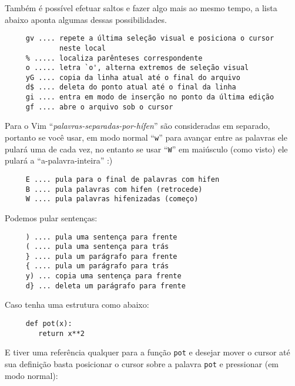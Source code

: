 Também é possível efetuar saltos e fazer algo mais ao mesmo tempo, a lista abaixo aponta 
algumas dessas possibilidades. %
\begin{verbatim}     
     gv .... repete a última seleção visual e posiciona o cursor
             neste local
     % ..... localiza parênteses correspondente
     o ..... letra `o', alterna extremos de seleção visual
     yG .... copia da linha atual até o final do arquivo
     d$ .... deleta do ponto atual até o final da linha
     gi .... entra em modo de inserção no ponto da última edição
     gf .... abre o arquivo sob o cursor
\end{verbatim}

Para o Vim ``{\em{palavras-separadas-por-hífen}}'' são consideradas em separado, portanto se você usar,
em modo normal ``\verb+w+'' para avançar entre as palavras ele pulará uma de
cada vez, no entanto se usar ``\verb+W+''
em maiúsculo (como visto) ele pulará a ``a-palavra-inteira'' :)

\begin{verbatim}
     E .... pula para o final de palavras com hifen
     B .... pula palavras com hifen (retrocede)
     W .... pula palavras hifenizadas (começo)
\end{verbatim}

Podemos pular sentenças:
\begin{verbatim}
     ) .... pula uma sentença para frente
     ( .... pula uma sentença para trás
     } .... pula um parágrafo para frente
     { .... pula um parágrafo para trás
     y) ... copia uma sentença para frente
     d} ... deleta um parágrafo para frente
\end{verbatim}

Caso tenha uma estrutura como abaixo:

\begin{verbatim}
     def pot(x):
        return x**2
\end{verbatim}

E tiver uma referência qualquer para a função \verb+pot+ e desejar
mover o cursor até sua definição basta posicionar o cursor sobre a palavra
\verb+pot+ e pressionar (em modo normal):

